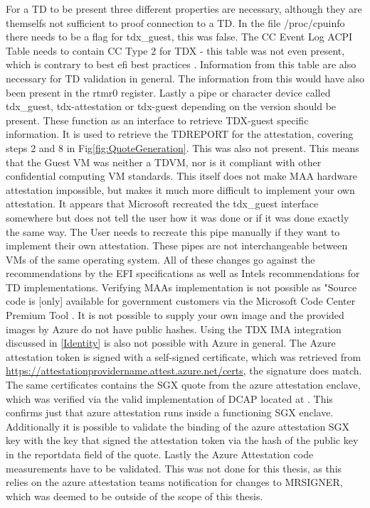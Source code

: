 \label{Issues-with-azure-td}
For a TD to be present three different properties are necessary, although they are themselfs not sufficient to proof connection to a TD. In the file /proc/cpuinfo there needs to be a flag for tdx\_guest, this was false. The CC Event Log ACPI Table needs to contain CC Type 2 for TDX - this table was not even present, which is contrary to best efi best practices \cite{uefi_forum_inc_acpi_docu_2022}. Information from this table are also necessary for TD validation in general. The information from this would have also been present in the rtmr0 register. Lastly a pipe or character device called tdx\_guest, tdx-attestation or tdx-guest depending on the version should be present. These function as an interface to retrieve TDX-guest specific information\cite{linux_kernel_development_community_tdx_2024}. It is used to retrieve the TDREPORT for the attestation, covering steps 2 and 8 in Fig\ref{fig:QuoteGeneration}. This was also not present. This means that the Guest VM was neither a TDVM, nor is it compliant with other confidential computing VM standards. This itself does not make MAA hardware attestation impossible, but makes it much more difficult to implement your own attestation. It appears that Microsoft recreated the tdx\_guest interface somewhere but does not tell the user how it was done or if it was done exactly the same way. The User needs to recreate this pipe manually if they want to implement their own attestation. These pipes are not interchangeable between VMs of the same operating system. All of these changes go against the recommendations by the EFI specifications as well as Intels recommendations for TD implementations.
Verifying MAAs implementation is not possible as \guillemotright"Source code is [only] available for government customers via the Microsoft Code Center Premium Tool \guillemotleft \cite{dan_mabee_azure_attestation_2023}. It is not possible to supply your own image and the provided images by Azure do not have public hashes. Using the TDX IMA integration discussed in \ref{Identity} is also not possible with Azure in general.
The Azure attestation token is signed with a self-signed certificate, which was retrieved from \url{https://attestationprovidername.attest.azure.net/certs}, the signature does match. The same certificates contains the SGX quote from the azure attestation enclave, which was verified via the valid implementation of DCAP located at \cite{microsoft_corporation_azure-samplesmicrosoft-azure-attestation_nodate}. This confirms just that azure attestation runs inside a functioning SGX enclave. Additionally it is possible to validate the binding of the azure attestation SGX key with the key that signed the attestation token via the hash of the public key in the reportdata field of the quote. Lastly the Azure Attestation code measurements have to be validated. This was not done for this thesis, as this relies on the azure attestation teams notification for changes to MRSIGNER, which was deemed to be outside of the scope of this thesis.

